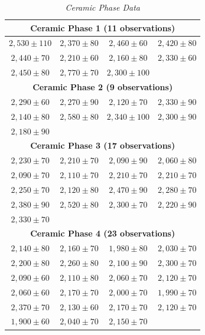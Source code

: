 \documentclass{article}
\begin{document}
\begin{table}[h]
    \centering
    \renewcommand{\arraystretch}{1.2} %
    \setlength{\tabcolsep}{10pt} %
    \caption{\textit{Ceramic Phase Data}}
    \footnotesize
    \begin{tabular}{c c c c}
        \hline
        \multicolumn{4}{c}{\textbf{Ceramic Phase 1 (11 observations)}} \\
        \hline
        $2,530 \pm 110$ & $2,370 \pm 80$  & $2,460 \pm 60$  & $2,420 \pm 80$  \\
        $2,440 \pm 70$  & $2,210 \pm 60$  & $2,160 \pm 80$  & $2,330 \pm 60$  \\
        $2,450 \pm 80$  & $2,770 \pm 70$  & $2,300 \pm 100$ & \\
        \hline
        \multicolumn{4}{c}{\textbf{Ceramic Phase 2 (9 observations)}} \\
        \hline
        $2,290 \pm 60$  & $2,270 \pm 90$  & $2,120 \pm 70$  & $2,330 \pm 90$  \\
        $2,140 \pm 80$  & $2,580 \pm 80$  & $2,340 \pm 100$ & $2,300 \pm 90$  \\
        $2,180 \pm 90$  & \\
        \hline
        \multicolumn{4}{c}{\textbf{Ceramic Phase 3 (17 observations)}} \\
        \hline
        $2,230 \pm 70$  & $2,210 \pm 70$  & $2,090 \pm 90$  & $2,060 \pm 80$  \\
        $2,090 \pm 70$  & $2,110 \pm 70$  & $2,210 \pm 70$  & $2,210 \pm 70$  \\
        $2,250 \pm 70$  & $2,120 \pm 80$  & $2,470 \pm 90$  & $2,280 \pm 70$  \\
        $2,380 \pm 90$  & $2,520 \pm 80$  & $2,300 \pm 70$  & $2,220 \pm 90$  \\
        $2,330 \pm 70$  & \\
        \hline
        \multicolumn{4}{c}{\textbf{Ceramic Phase 4 (23 observations)}} \\
        \hline
        $2,140 \pm 80$  & $2,160 \pm 70$  & $1,980 \pm 80$  & $2,030 \pm 70$  \\
        $2,200 \pm 80$  & $2,260 \pm 80$  & $2,100 \pm 90$  & $2,300 \pm 70$  \\
        $2,090 \pm 60$  & $2,110 \pm 80$  & $2,060 \pm 70$  & $2,120 \pm 70$  \\
        $2,060 \pm 60$  & $2,170 \pm 70$  & $2,000 \pm 70$  & $1,990 \pm 70$  \\
        $2,370 \pm 70$  & $2,130 \pm 60$  & $2,170 \pm 70$  & $2,120 \pm 70$  \\
        $1,900 \pm 60$  & $2,040 \pm 70$  & $2,150 \pm 70$  & \\
        \hline
    \end{tabular}
\end{table}
\end{document}
